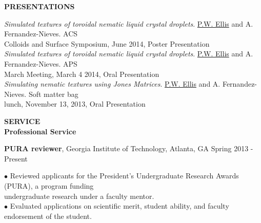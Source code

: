 \documentclass[10pt]{article}
\newenvironment{changemargin}[2]{%
  \list{}{\rightmargin#2\leftmargin#1
    \parsep=0pt\topsep=1pt\partopsep=0pt}
\item[]} {\endlist}
\newenvironment{indentmore}{\begin{changemargin}{10pt}{0cm}}{\end{changemargin}}
\begin{document}
\textbf{\large PRESENTATIONS}
\begin{indentmore}
\emph{Simulated textures of toroidal nematic liquid crystal droplets}. \underline{P.W. Ellis} and A. Fernandez-Nieves. ACS\\ \hspace*{15pt}Colloids and Surface Symposium, June 2014, Poster Presentation\\

\emph{Simulated textures of toroidal nematic liquid crystal droplets}. \underline{P.W. Ellis} and A. Fernandez-Nieves. APS\\ \hspace*{15pt}March Meeting, March 4 2014, Oral Presentation\\

\emph{Simulating nematic textures using Jones Matrices}. \underline{P.W. Ellis} and A. Fernandez-Nieves. Soft matter bag\\ \hspace*{15pt} lunch, November 13, 2013, Oral Presentation\\
\end{indentmore}
 
%
%
%
%

\textbf{\large SERVICE}\\
{\bf Professional Service}
\begin{indentmore}
{\bf PURA reviewer}, Georgia Institute of Technology, Atlanta, GA \hfill Spring 2013 - Present
\begin{indentmore}
$\bullet$ Reviewed applicants for the President's Undergraduate Research Awards (PURA), a program funding \\ \hspace*{5pt} undergraduate research under a faculty mentor.\\
$\bullet$ Evaluated applications on scientific merit, student ability, and faculty endorsement of the student.\\
\end{indentmore}
\end{indentmore}
\end{document}
